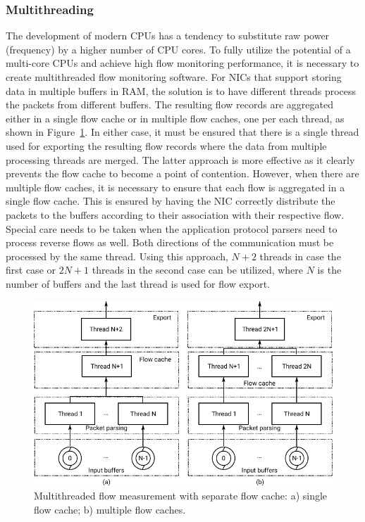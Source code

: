 \subsubsection{Multithreading}
The development of modern CPUs has a tendency to substitute raw power (frequency) by a higher number of CPU cores. To fully utilize the potential of a multi-core CPUs and achieve high flow monitoring performance, it is necessary to create multithreaded flow monitoring software. For NICs that support storing data in multiple buffers in RAM, the solution is to have different threads process the packets from different buffers. The resulting flow records are aggregated either in a single flow cache or in multiple flow caches, one per each thread, as shown in Figure~\ref{fig:exporter-thread-schema}. In either case, it must be ensured that there is a single thread used for exporting the resulting flow records where the data from multiple processing threads are merged. The latter approach is more effective as it clearly prevents the flow cache to become a point of contention. However, when there are multiple flow caches, it is necessary to ensure that each flow is aggregated in a single flow cache. This is ensured by having the NIC correctly distribute the packets to the buffers according to their association with their respective flow. Special care needs to be taken when the application protocol parsers need to process reverse flows as well. Both directions of the communication must be processed by the same thread. Using this approach, $N+2$ threads in case the first case or $2N+1$ threads in the second case can be utilized, where $N$ is the number of buffers and the last thread is used for flow export. 

\begin{figure}[t!]
  \begin{center}
    \includegraphics[width=\textwidth]{figures/exporter-thread-schema}
  \end{center}
  \caption{Multithreaded flow measurement with separate flow cache: a) single flow cache; b) multiple flow caches.}
  \label{fig:exporter-thread-schema}
\end{figure}

